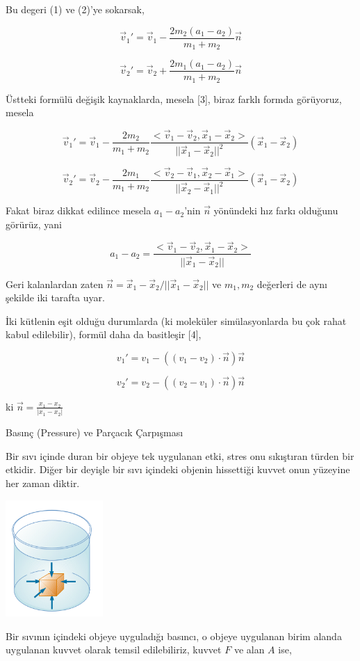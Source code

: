 \documentclass[12pt,fleqn]{article}\usepackage{../../common}
\begin{document}
Bu degeri (1) ve (2)'ye sokarsak,


$$
\vec{v}_1' = \vec{v}_1 - \frac{2 m_2 (a_1-a_2)}{m_1+m_2} \vec{n}
$$

$$
\vec{v}_2' = \vec{v}_2 + \frac{2 m_1 (a_1-a_2)}{m_1+m_2} \vec{n}
$$

Üstteki formülü değişik kaynaklarda, mesela [3], biraz farklı formda görüyoruz,
mesela

$$
\vec{v}_1' =
\vec{v}_1 - \frac{2m_2}{m_1+m_2}
\frac{< \vec{v}_1-\vec{v}_2, \vec{x}_1-\vec{x}_2 >}{||\vec{x}_1-\vec{x}_2||^2}
(\vec{x}_1-\vec{x}_2)
$$

$$
\vec{v}_2' =
\vec{v}_2 - \frac{2m_1}{m_1+m_2}
\frac{< \vec{v}_2-\vec{v}_1, \vec{x}_2-\vec{x}_1 >}{||\vec{x}_2-\vec{x}_1||^2}
(\vec{x}_1-\vec{x}_2)
$$

Fakat biraz dikkat edilince mesela $a_1-a_2$'nin $\vec{n}$ yönündeki hız farkı
olduğunu görürüz, yani

$$
a_1-a_2=\frac{< \vec{v}_1-\vec{v}_2,\vec{x}_1-\vec{x}_2 >}{||\vec{x}_1-\vec{x}_2||}
$$

Geri kalanlardan zaten $\vec{n} = \vec{x}_1-\vec{x}_2/||\vec{x}_1-\vec{x}_2||$
ve $m_1,m_2$ değerleri de aynı şekilde iki tarafta uyar.

İki kütlenin eşit olduğu durumlarda (ki moleküler simülasyonlarda bu çok rahat
kabul edilebilir), formül daha da basitleşir [4],

$$
v_1' = v_1 - \left( (v_1-v_2)  \cdot \vec{n} \right) \vec{n}
$$

$$
v_2' = v_2 - \left( (v_2-v_1)  \cdot \vec{n} \right) \vec{n}
$$

ki $\vec{n} = \frac{x_1-x_2}{|x_1-x_2|}$

Basınç (Pressure) ve Parçacık Çarpışması

Bir sıvı içinde duran bir objeye tek uygulanan etki, stres onu
sıkıştıran türden bir etkidir. Diğer bir deyişle bir sıvı içindeki
objenin hissettiği kuvvet onun yüzeyine her zaman diktir.

\includegraphics[width=10em]{phy_005_basics_07.png}

Bir sıvının içindeki objeye uyguladığı basıncı, o objeye uygulanan
birim alanda uygulanan kuvvet olarak temsil edilebiliriz, kuvvet $F$
ve alan $A$ ise,
\end{document}
